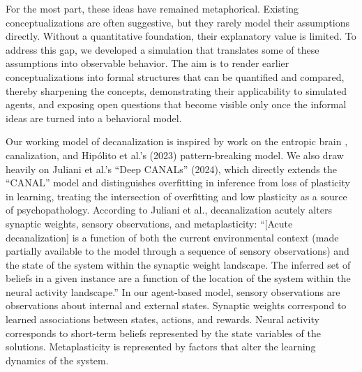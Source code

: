 \documentclass[12pt,fleqn]{article}
\begin{document}
For the most part, these ideas have remained metaphorical. Existing conceptualizations are often suggestive, but they rarely model their assumptions directly. Without a quantitative foundation, their explanatory value is limited. To address this gap, we developed a simulation that translates some of these assumptions into observable behavior. The aim is to render earlier conceptualizations into formal structures that can be quantified and compared, thereby sharpening the concepts, demonstrating their applicability to simulated agents, and exposing open questions that become visible only once the informal ideas are turned into a behavioral model.

Our working model of decanalization is inspired by work on the entropic brain \cite{carhart-harris_entropic_2014,carhart-harris_entropic_2018}, canalization, and Hipólito et al.'s (2023) pattern-breaking model. We also draw heavily on Juliani et al.'s “Deep CANALs” (2024), which directly extends the ``CANAL'' model \cite{carhart-harris_canalization_2023} and distinguishes overfitting in inference from loss of plasticity in learning, treating the intersection of overfitting and low plasticity as a source of psychopathology. According to Juliani et al., decanalization acutely alters synaptic weights, sensory observations, and metaplasticity: “[Acute decanalization] is a function of both the current environmental context (made partially available to the model through a sequence of sensory observations) and the state of the system within the synaptic weight landscape. The inferred set of beliefs in a given instance are a function of the location of the system within the neural activity landscape.” In our agent-based model, sensory observations are observations about internal and external states. Synaptic weights correspond to learned associations between states, actions, and rewards. Neural activity corresponds to short-term beliefs represented by the state variables of the solutions. Metaplasticity is represented by factors that alter the learning dynamics of the system.
\end{document}
